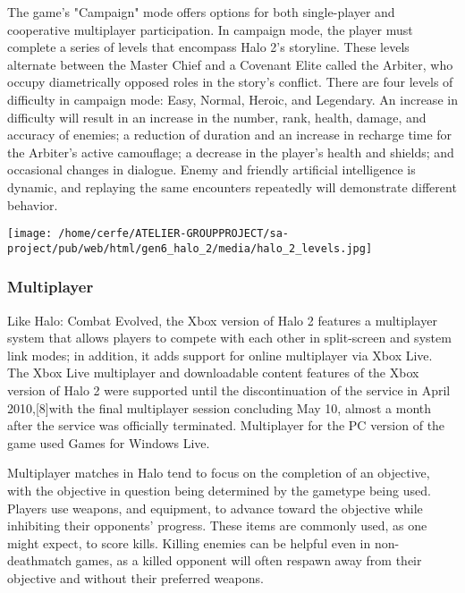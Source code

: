 \documentclass[a4paper,10pt]{book}
\begin{document}
          The game's "Campaign" mode offers options for both single-player and cooperative multiplayer participation. In campaign mode, the player must complete a series of levels that encompass Halo 2's storyline.
          These levels alternate between the Master Chief and a Covenant Elite called the Arbiter, who occupy diametrically opposed roles in the story's conflict. 
          There are four levels of difficulty in campaign mode: Easy, Normal, Heroic, and Legendary. An increase in difficulty will result in an increase in the number, rank, health, damage, and accuracy of enemies;
          a reduction of duration and an increase in recharge time for the Arbiter's active camouflage; a decrease in the player's health and shields; and occasional changes in dialogue.
          Enemy and friendly artificial intelligence is dynamic, and replaying the same encounters repeatedly will demonstrate different behavior.
         
 \texttt{[image: /home/cerfe/ATELIER-GROUPPROJECT/sa-project/pub/web/html/gen6\_halo\_2/media/halo\_2\_levels.jpg]}
 
 \subsubsection{Multiplayer }
 
          Like Halo: Combat Evolved, the Xbox version of Halo 2 features a multiplayer system that allows players to compete with each other in split-screen and system link modes; in addition, it adds support for online multiplayer via Xbox Live.
          The Xbox Live multiplayer and downloadable content features of the Xbox version of Halo 2 were supported until the discontinuation of the service in April 2010,[8]with the final multiplayer session concluding May 10, almost a month after the service was officially terminated.
          Multiplayer for the PC version of the game used Games for Windows  Live.
         
 
          Multiplayer matches in Halo tend to focus on the completion of an objective, with the objective in question being determined by the gametype being used. Players use weapons, and equipment, to advance toward the objective while inhibiting their opponents' progress.
          These items are commonly used, as one might expect, to score kills.  Killing enemies can be helpful even in non-deathmatch games, as a killed opponent will often respawn away from their objective and without their preferred weapons.
         
\end{document}

